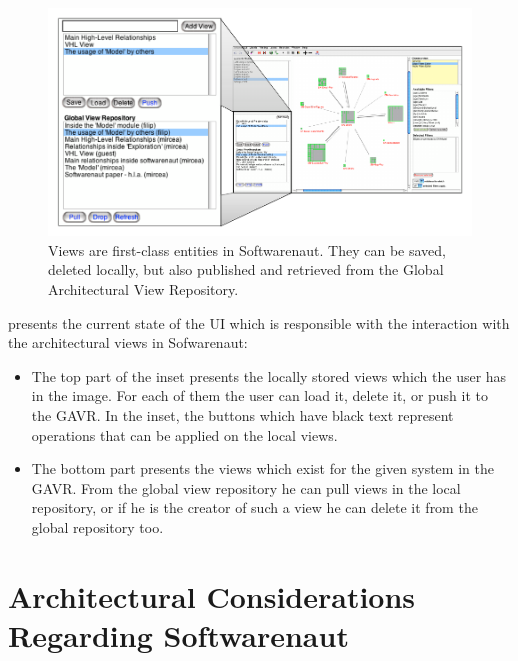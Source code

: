 \documentclass[preprint,12pt]{elsarticle}
\begin{document}
\begin{figure}[ht]
\begin{center}
\includegraphics[width=1.05\linewidth]{ViewOperations}
\caption{Views are first-class entities in Softwarenaut. They can be saved, deleted locally, but also published and retrieved from the Global Architectural View Repository.}
\end{center}
\end{figure}

 presents the current state of the UI which is responsible with the interaction with the architectural views in Sofwarenaut: 

\begin{itemize}

\item The top part of the inset presents the locally stored views which the user has in the image. For each of them the user can load it, delete it, or push it to the GAVR. In the inset, the buttons which have black text represent operations that can be applied on the local views.

\item The bottom part presents the views which exist for the given system in the GAVR. From the global view repository he can pull views in the local repository, or if he is the creator of such a view he can delete it from the global repository too. 

\end{itemize}


\section {Architectural Considerations Regarding Softwarenaut} 
\end{document}
